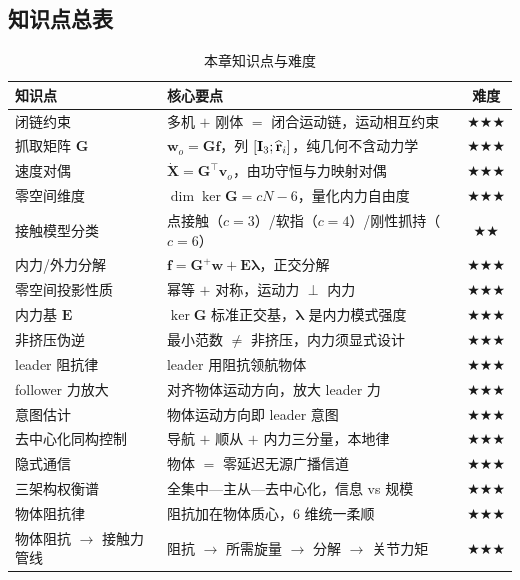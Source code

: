 \subsection*{知识点总表}
\begin{table}[H]\centering\small
\caption{本章知识点与难度}
\label{tab:cm-knowledge}
\begin{tabular}{p{4.6cm}p{7.0cm}c}
\toprule
知识点 & 核心要点 & 难度 \\
\midrule
闭链约束 & 多机 $+$ 刚体 $=$ 闭合运动链，运动相互约束 & $\bigstar\bigstar\bigstar$ \\
抓取矩阵 $\mathbf{G}$ & $\mathbf{w}_o=\mathbf{G}\mathbf{f}$，列 $[\mathbf{I}_3;\widehat{\mathbf{r}}_i]$，纯几何不含动力学 & $\bigstar\bigstar\bigstar$ \\
速度对偶 & $\dot{\mathbf{X}}=\mathbf{G}^\top\mathbf{v}_o$，由功守恒与力映射对偶 & $\bigstar\bigstar\bigstar$ \\
零空间维度 & $\dim\ker\mathbf{G}=cN-6$，量化内力自由度 & $\bigstar\bigstar\bigstar$ \\
接触模型分类 & 点接触（$c{=}3$）/软指（$c{=}4$）/刚性抓持（$c{=}6$） & $\bigstar\bigstar$ \\
内力/外力分解 & $\mathbf{f}=\mathbf{G}^{+}\mathbf{w}+\mathbf{E}\boldsymbol{\lambda}$，正交分解 & $\bigstar\bigstar\bigstar$ \\
零空间投影性质 & 幂等 $+$ 对称，运动力 $\perp$ 内力 & $\bigstar\bigstar\bigstar$ \\
内力基 $\mathbf{E}$ & $\ker\mathbf{G}$ 标准正交基，$\boldsymbol{\lambda}$ 是内力模式强度 & $\bigstar\bigstar\bigstar$ \\
非挤压伪逆 & 最小范数 $\ne$ 非挤压，内力须显式设计 & $\bigstar\bigstar\bigstar$ \\
leader 阻抗律 & leader 用阻抗领航物体 & $\bigstar\bigstar\bigstar$ \\
follower 力放大 & 对齐物体运动方向，放大 leader 力 & $\bigstar\bigstar\bigstar$ \\
意图估计 & 物体运动方向即 leader 意图 & $\bigstar\bigstar\bigstar$ \\
去中心化同构控制 & 导航 $+$ 顺从 $+$ 内力三分量，本地律 & $\bigstar\bigstar\bigstar$ \\
隐式通信 & 物体 $=$ 零延迟无源广播信道 & $\bigstar\bigstar\bigstar$ \\
三架构权衡谱 & 全集中—主从—去中心化，信息 vs 规模 & $\bigstar\bigstar\bigstar$ \\
物体阻抗律 & 阻抗加在物体质心，$6$ 维统一柔顺 & $\bigstar\bigstar\bigstar$ \\
物体阻抗 $\to$ 接触力管线 & 阻抗 $\to$ 所需旋量 $\to$ 分解 $\to$ 关节力矩 & $\bigstar\bigstar\bigstar$ \\

\end{tabular}
\end{table}
